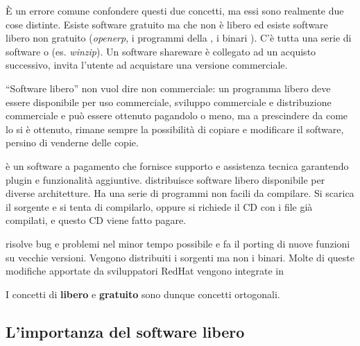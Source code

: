 È un errore comune confondere questi due concetti, ma essi sono realmente due cose distinte. Esiste software gratuito ma che non è libero ed esiste software libero non gratuito (\textit{openerp}, i programmi della , i binari ). C'è tutta una serie di software  o  (es. \textit{winzip}). Un software shareware è collegato ad un acquisto successivo, invita l'utente ad acquistare una versione commerciale.

``Software libero'' non vuol dire non commerciale: un programma libero deve essere disponibile per uso commerciale, sviluppo commerciale e distribuzione commerciale e può essere ottenuto pagandolo o meno, ma a prescindere da come lo si è ottenuto, rimane sempre la possibilità di copiare e modificare il software, persino di venderne delle copie.

 è un software a pagamento che fornisce supporto e assistenza tecnica garantendo plugin e funzionalità aggiuntive. 
 distribuisce software libero disponibile per diverse architetture. Ha una serie di programmi non facili da compilare. Si scarica il sorgente e si tenta di compilarlo, oppure si richiede il CD con i file già compilati, e questo CD viene fatto pagare.

 risolve bug e problemi nel minor tempo possibile e fa il porting di nuove funzioni su vecchie versioni. Vengono distribuiti i sorgenti ma non i binari. Molte di queste modifiche apportate da sviluppatori RedHat vengono integrate in 

I concetti di \textbf{libero} e \textbf{gratuito} sono dunque concetti ortogonali.

\subsection{L'importanza del software libero}

